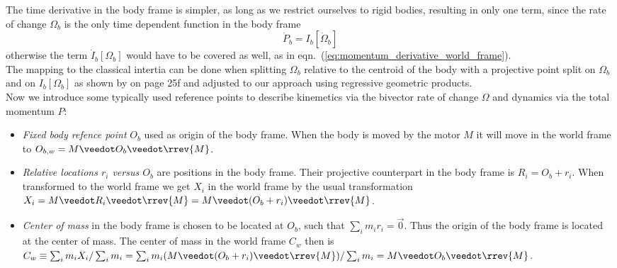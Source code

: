 The time derivative in the body frame is simpler, as long as we restrict ourselves to
rigid bodies, resulting in only one term, since the rate of change $\Omega_b$ is the only
time dependent function in the body frame
\begin{equation}
    \dot{P}_b = I_b[\dot{\Omega}_b]
    \label{eq:momentum_derivative_body_frame}
\end{equation}
otherwise the term $\dot{I}_b[\Omega_b]$ would have to be covered as well, as in
eqn.~(\ref{eq:momentum_derivative_world_frame}). \\

The mapping to the classical intertia can be done when splitting $\Omega_b$ relative to
the centroid of the body with a projective point split on $\Omega_b$ and on
$I_b[\Omega_b]$ as shown by \cite{Dynamics_in_PGA_plane-based_Dorst-DeKennik:2023} on page
25f and adjusted to our approach using regressive geometric products. \\

Now we introduce some typically used reference points to describe kinemetics via the
bivector rate of change $\Omega$ and dynamics via the total momentum $P$:
\begin{itemize}
    \item \emph{Fixed body refence point} $O_b$ used as origin of the body frame. When the
    body is moved by the motor $M$ it will move in the world frame to $O_{b,w} = M \veedot
    O_b \veedot \rrev{M}$.
    \item \emph{Relative locations $r_i$ versus $O_b$} are positions in the body frame.
    Their projective counterpart in the body frame is $R_i = O_b + r_i$. When transformed
    to the world frame we get $X_i$ in the world frame by the usual transformation $X_i =
    M \veedot R_i \veedot \rrev{M} = M \veedot (O_b + r_i) \veedot \rrev{M}$.
    \item \emph{Center of mass} in the body frame is chosen to be located at $O_b$, such
    that $\sum_i{m_i r_i} = \vec{0}$. Thus the origin of the body frame is located at the
    center of mass. The center of mass in the world frame $C_w$ then is $C_w \equiv
    \sum_i{m_i X_i} / \sum_i{m_i} = \sum_i{m_i (M \veedot (O_b + r_i) \veedot \rrev{M})} /
    \sum_i{m_i} = M \veedot O_b \veedot \rrev{M}$.
\end{itemize}

